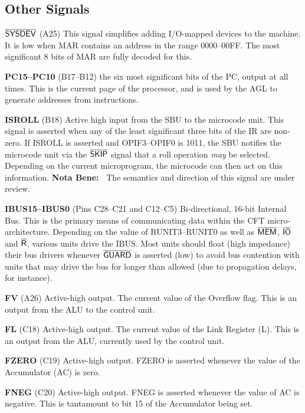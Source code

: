 \documentclass[11pt,a4paper,twocolumns]{article}
\newcommand{\ns}[1]{$\overline{\mbox{\textsf{{#1}}}}$}
\newcommand{\ps}[1]{\textsf{#1}}
\newcommand\bus[1]{{#1}}
\newcommand\unit[1]{{#1}}
\newcommand\IBUS{\bus{IBUS}}
\newcommand\ALU{\unit{ALU}}
\newcommand\SBU{\unit{SBU}}
\newcommand\AGL{\unit{AGL}}
\newcommand\register[1]{\textsf{#1}}
\newcommand\A{\register{AC}}
\newcommand\Lreg{\register{L}}
\newcommand\MAR{\register{MAR}}
\newcommand\PC{\register{PC}}
\newcommand\IR{\register{IR}}
\newcommand\RUNITn[1]{\ps{RUNIT{#1}}}
\newcommand\SYSDEV{\ns{SYSDEV}}
\newcommand\OPIFn[1]{\ps{OPIF{#1}}}
\newcommand\GUARDPULSE{\ns{GUARD}}
\newcommand\GP{\GUARDPULSE}
\newcommand\BOE{\ns{BOE}}
\newcommand\UOE{\ns{UOE}}
\newcommand\SKIP{\ns{SKIP}}
\newcommand\PCn[1]{\ps{PC{#1}}}
\newcommand\IBUSn[1]{\ps{IBUS#1}}
\newcommand\ISROLL{\ps{ISROLL}}
\newcommand\MEM{\ns{MEM}}
\newcommand\IO{\ns{IO}}
\newcommand\READ{\ns{R}}
\newcommand\FL{\ps{FL}}
\newcommand\FV{\ps{FV}}
\newcommand\FZERO{\ps{FZERO}}
\newcommand\FNEG{\ps{FNEG}}
\newcommand\NB{\textbf{Nota Bene:\ }}
\begin{document}
\subsection{Other Signals}

\begin{description}
\item{\bf \SYSDEV} (A25) This signal simplifies adding I/O-mapped
  devices to the machine. It is low when \MAR{} contains an address in
  the range 0000–00FF. The most significant 8 bits of \MAR{} are fully
  decoded for this.
\item{\bf \PCn{15}–\PCn{10}} (B17–B12) the six most significant bits
  of the \PC, output at all times. This is the current page of the
  processor, and is used by the \AGL{} to generate addresses from
  instructions.
\item{\bf \ISROLL} (B18) Active high input from the \SBU{} to the
  microcode unit. This signal is asserted when any of the least
  significant three bits of the \IR{} are non-zero. If \ISROLL{} is
  asserted and \OPIFn{3}–\OPIFn{0} is \textsf{1011}, the \SBU{}
  notifies the microcode unit via the \SKIP{} signal that a roll
  operation {\em may\/} be selected. Depending on the current
  microprogram, the microcode can then act on this information. \NB
  The semantics and direction of this signal are under review.
\item{\bf \IBUSn{15}–\IBUSn{0}} (Pins C28–C21 and C12–C5)
  Bi-directional, 16-bit Internal Bus. This is the primary means of
  communicating data within the CFT micro-architecture. Depending on
  the value of \RUNITn{3}–\RUNITn{0} as well as \MEM, \IO{} and \READ,
  various units drive the \IBUS. Most units should float (high
  impedance) their bus drivers whenever \GP{} is asserted (low) to avoid
  bus contention with units that may drive the bus for longer than
  allowed (due to propagation delays, for instance).
\item{\bf \FV} (A26) Active-high output. The current value of the
  Overflow flag. This is an output from the ALU to the control unit.
\item{\bf \FL} (C18) Active-high output. The current value of the Link
  Register (\Lreg). This is an output from the ALU, currently used by
  the control unit.
\item{\bf \FZERO} (C19) Active-high output. \FZERO{} is asserted
  whenever the value of the Accumulator (\A) is zero.
\item{\bf \FNEG} (C20) Active-high output. \FNEG{} is asserted
  whenever the value of \A{} is negative. This is tantamount to bit
  15 of the Accumulator being set.
\end{description}
\end{document}
